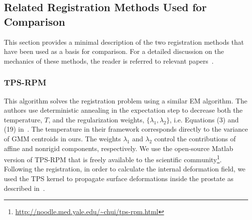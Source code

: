 \documentclass[journal]{IEEEtran}
\begin{document}
\subsection{Related Registration Methods Used for Comparison}
This section provides a minimal description of the two registration methods that have been used as a basis for comparison. For a detailed discussion on the mechanics of these methods, the reader is referred to relevant papers~\cite{Chui03a,Ferrant01a}.
\subsubsection{TPS-RPM}\label{sec:tpsrpm}
This algorithm solves the registration problem using a similar EM algorithm. The authors use deterministic annealing in the expectation step to decrease both the temperature, $T$, and the regularization weights, $\{\lambda_1, \lambda_2\}$, i.e. Equations (3) and (19) in~\cite{Chui03a}. The temperature in their
framework corresponds directly to the variance of GMM centroids in ours. The weights $\lambda_1$ and $\lambda_2$ control the contributions of affine and nonrigid components, respectively. We use the open-source Matlab version of TPS-RPM that is freely available to the scientific community\footnote{\url{http://noodle.med.yale.edu/~chui/tps-rpm.html}}. Following the registration, in order to calculate the internal deformation field, we used the TPS kernel to propagate surface deformations inside the prostate as described in~\cite{Sibson91a}.
\end{document}
